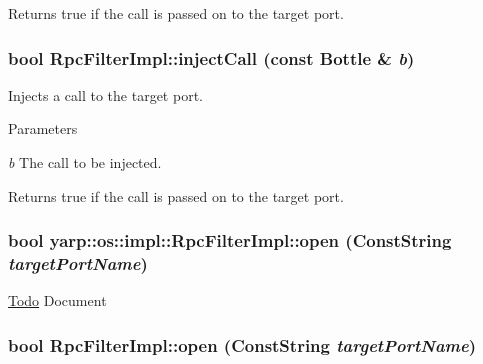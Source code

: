 \begin{DoxyReturn}{Returns}
{\ttfamily true} if the call is passed on to the target port. 
\end{DoxyReturn}
\hypertarget{classyarp_1_1os_1_1impl_1_1_rpc_filter_impl_a0f795cf3383a030884a7fde9843de1f7}{
\subsubsection[{injectCall}]{\setlength{\rightskip}{0pt plus 5cm}bool RpcFilterImpl::injectCall (const Bottle \& {\em b})}}
\label{classyarp_1_1os_1_1impl_1_1_rpc_filter_impl_a0f795cf3383a030884a7fde9843de1f7}
Injects a call to the target port. 
\begin{DoxyParams}{Parameters}
\item[{\em b}]The call to be injected. \end{DoxyParams}
\begin{DoxyReturn}{Returns}
{\ttfamily true} if the call is passed on to the target port. 
\end{DoxyReturn}
\hypertarget{classyarp_1_1os_1_1impl_1_1_rpc_filter_impl_a430fa4ad4d3f633a1e9b91f3ad0a0df4}{
\subsubsection[{open}]{\setlength{\rightskip}{0pt plus 5cm}bool yarp::os::impl::RpcFilterImpl::open (ConstString {\em targetPortName})}}
\label{classyarp_1_1os_1_1impl_1_1_rpc_filter_impl_a430fa4ad4d3f633a1e9b91f3ad0a0df4}
\begin{Desc}
\item[\hyperlink{todo__todo000012}{Todo}]Document \end{Desc}
\hypertarget{classyarp_1_1os_1_1impl_1_1_rpc_filter_impl_a9ee7fb8756ba19285866308cdf1d60c2}{
\subsubsection[{open}]{\setlength{\rightskip}{0pt plus 5cm}bool RpcFilterImpl::open (ConstString {\em targetPortName})}}
